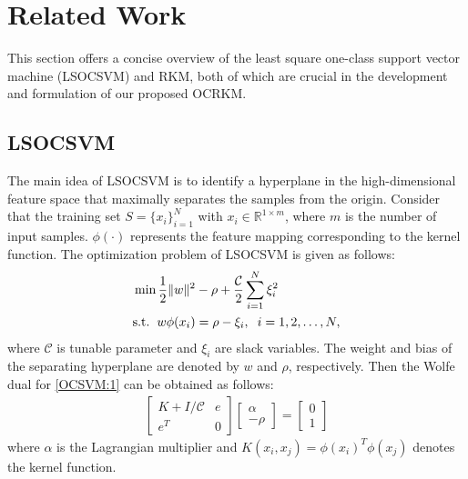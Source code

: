 \section{Related Work}
\label{Related Work}
This section offers a concise overview of the least square one-class support vector machine (LSOCSVM) and RKM, both of which are crucial in the development and formulation of our proposed OCRKM.
\subsection{LSOCSVM}
The main idea of LSOCSVM \cite{choi2009least} is to identify a hyperplane in the high-dimensional feature space that maximally separates the samples from the origin. Consider that the training set $S=\{x_i\}_{i=1}^N$ with \(x_i \in \mathbb{R}^{1 \times m}\), where \(m\) is the number of input samples. $\phi(\cdot)$ represents the feature mapping corresponding to the kernel function. The optimization problem of LSOCSVM is given as follows:
\begin{align}
\label{OCSVM:1}
    &\min\frac{1}{2}\|w\|^2 - \rho +  \frac{\mathcal{C}}{2}\sum_{i=1}^N \xi_i^2 \nonumber \\
    &\text{s.t.} \hspace{0.2cm} w\phi(x_i) = \rho - \xi_i, \hspace{0.2cm} i=1,2,\ldots, N,
\end{align}
where $\mathcal{C}$ is tunable parameter and $\xi_i$ are slack variables. The weight and bias of the separating hyperplane are denoted by $w$ and $\rho$, respectively. Then the Wolfe dual for \eqref{OCSVM:1} can be obtained as follows:
\begin{align}
\left[\begin{array}{c|c } 
	 K + I/\mathcal{C} & e  \\  
	\hline 
	 e^T    & 0  
\end{array}\right]
    \begin{bmatrix}
    \alpha \\ -\rho 
    \end{bmatrix}  =  \begin{bmatrix} 0 \\   1   \end{bmatrix}
\end{align}
where $\alpha$ is the Lagrangian multiplier and \(K(x_i, x_j) = \phi(x_i)^T\phi(x_j)\) denotes the kernel function.
